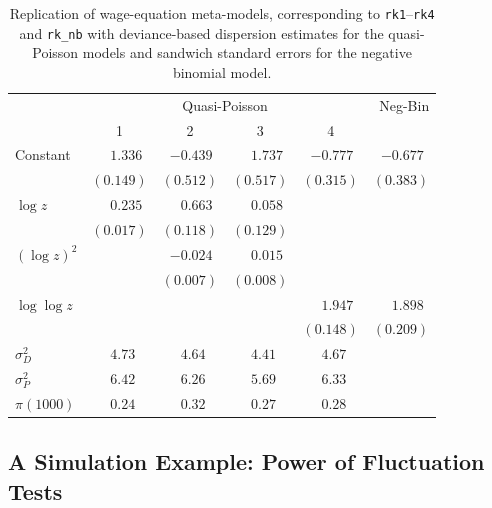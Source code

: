 \documentclass[10pt,a4paper,twoside]{article}
\let\code=\texttt
\begin{document}
\begin{table}[t]
\caption{\label{tab:rk} Replication of wage-equation meta-models, corresponding
to \code{rk1}--\code{rk4} and \code{rk\_nb} with deviance-based dispersion
estimates for the quasi-Poisson models and sandwich standard errors for the negative
binomial model.}
\begin{center}
\begin{tabular}{lrrrrr} \hline
& \multicolumn{4}{c}{Quasi-Poisson} & Neg-Bin \\
& \multicolumn{1}{c}{1} & \multicolumn{1}{c}{2} & \multicolumn{1}{c}{3}
& \multicolumn{1}{c}{4} & \\ \hline
Constant & $1.336\phantom{)}$ & $-0.439\phantom{)}$ & $1.737\phantom{)}$ & $-0.777\phantom{)}$ & $-0.677\phantom{)}$ \\
 & $(0.149)$ & $(0.512)$ & $(0.517)$ & $(0.315)$ & $(0.383)$ \\
$\log z$ & $0.235\phantom{)}$ & $0.663\phantom{)}$ & $0.058\phantom{)}$ &  &  \\
 & $(0.017)$ & $(0.118)$ & $(0.129)$ &  &  \\
$(\log z)^2$ &  & $-0.024\phantom{)}$ & $0.015\phantom{)}$ &  &  \\
 &  & $(0.007)$ & $(0.008)$ &  &  \\
$\log \log z$ &  &  &  & $1.947\phantom{)}$ & $1.898\phantom{)}$ \\
 &  &  &  & $(0.148)$ & $(0.209)$ \\ \hline
$\sigma^2_D$ & $4.73\phantom{0)}$ & $4.64\phantom{0)}$ & $4.41\phantom{0)}$ & $4.67\phantom{0)}$ & $\phantom{0)}$ \\
$\sigma^2_P$ & $6.42\phantom{0)}$ & $6.26\phantom{0)}$ & $5.69\phantom{0)}$ & $6.33\phantom{0)}$ & $\phantom{0)}$ \\
$\pi(1000)$ & $0.24\phantom{0)}$ & $0.32\phantom{0)}$ & $0.27\phantom{0)}$ & $0.28\phantom{0)}$ & $\phantom{0)}$ \\ \hline\end{tabular}
\end{center}
\end{table}


\subsection{A Simulation Example: Power of Fluctuation Tests} \label{sec:fluctuation}
\end{document}
